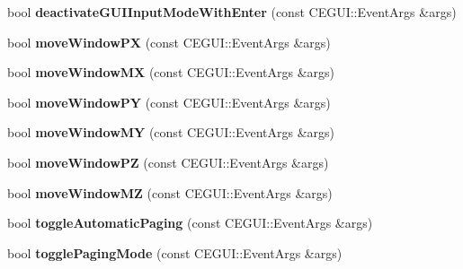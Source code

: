 \begin{DoxyCompactItemize}
\item 
\hypertarget{classGame_ae48b8c67ed929067f4cc7976f2e3224c}{
bool {\bfseries deactivate\-G\-U\-I\-Input\-Mode\-With\-Enter} (const \-C\-E\-G\-U\-I\-::\-Event\-Args \&args)}
\label{d9/d68/classGame_ae48b8c67ed929067f4cc7976f2e3224c}

\item 
\hypertarget{classGame_a4b72e14ac49f4ba7e814d7550d74e15e}{
bool {\bfseries move\-Window\-P\-X} (const \-C\-E\-G\-U\-I\-::\-Event\-Args \&args)}
\label{d9/d68/classGame_a4b72e14ac49f4ba7e814d7550d74e15e}

\item 
\hypertarget{classGame_a55586797d95f729b99ebae6250edebfa}{
bool {\bfseries move\-Window\-M\-X} (const \-C\-E\-G\-U\-I\-::\-Event\-Args \&args)}
\label{d9/d68/classGame_a55586797d95f729b99ebae6250edebfa}

\item 
\hypertarget{classGame_a7ac702c2f5ef72c6f05ca98bf2558b57}{
bool {\bfseries move\-Window\-P\-Y} (const \-C\-E\-G\-U\-I\-::\-Event\-Args \&args)}
\label{d9/d68/classGame_a7ac702c2f5ef72c6f05ca98bf2558b57}

\item 
\hypertarget{classGame_aed12c25196e0bdf49c48882c4b0de168}{
bool {\bfseries move\-Window\-M\-Y} (const \-C\-E\-G\-U\-I\-::\-Event\-Args \&args)}
\label{d9/d68/classGame_aed12c25196e0bdf49c48882c4b0de168}

\item 
\hypertarget{classGame_a331cc9ca9ff5c937ac91bb3c81e83df5}{
bool {\bfseries move\-Window\-P\-Z} (const \-C\-E\-G\-U\-I\-::\-Event\-Args \&args)}
\label{d9/d68/classGame_a331cc9ca9ff5c937ac91bb3c81e83df5}

\item 
\hypertarget{classGame_a439017ef264ea9d33d7a11562bfbf0da}{
bool {\bfseries move\-Window\-M\-Z} (const \-C\-E\-G\-U\-I\-::\-Event\-Args \&args)}
\label{d9/d68/classGame_a439017ef264ea9d33d7a11562bfbf0da}

\item 
\hypertarget{classGame_a0997593b0923fd31a08f53ab242b47ff}{
bool {\bfseries toggle\-Automatic\-Paging} (const \-C\-E\-G\-U\-I\-::\-Event\-Args \&args)}
\label{d9/d68/classGame_a0997593b0923fd31a08f53ab242b47ff}

\item 
\hypertarget{classGame_a0671240965c019781cb781c5ec2dc735}{
bool {\bfseries toggle\-Paging\-Mode} (const \-C\-E\-G\-U\-I\-::\-Event\-Args \&args)}
\label{d9/d68/classGame_a0671240965c019781cb781c5ec2dc735}


\end{DoxyCompactItemize}
